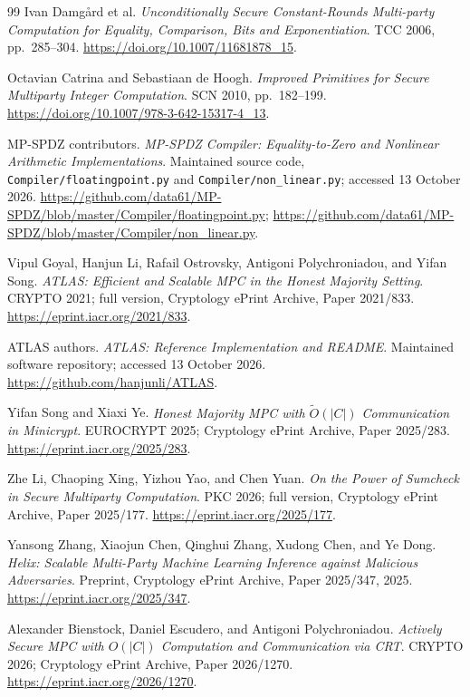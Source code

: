 \documentclass[11pt]{article}
\begin{document}
\begin{thebibliography}{99}
Ivan Damg\aa rd et al.
\emph{Unconditionally Secure Constant-Rounds Multi-party Computation for Equality, Comparison, Bits and Exponentiation}.
TCC 2006, pp.~285--304.
\url{https://doi.org/10.1007/11681878_15}.

Octavian Catrina and Sebastiaan de Hoogh.
\emph{Improved Primitives for Secure Multiparty Integer Computation}.
SCN 2010, pp.~182--199.
\url{https://doi.org/10.1007/978-3-642-15317-4_13}.

MP-SPDZ contributors.
\emph{MP-SPDZ Compiler: Equality-to-Zero and Nonlinear Arithmetic Implementations}.
Maintained source code, \texttt{Compiler/floatingpoint.py} and
\texttt{Compiler/non\_linear.py}; accessed 13 October 2026.
\url{https://github.com/data61/MP-SPDZ/blob/master/Compiler/floatingpoint.py};
\url{https://github.com/data61/MP-SPDZ/blob/master/Compiler/non_linear.py}.

Vipul Goyal, Hanjun Li, Rafail Ostrovsky, Antigoni Polychroniadou, and Yifan Song.
\emph{ATLAS: Efficient and Scalable MPC in the Honest Majority Setting}.
CRYPTO 2021; full version, Cryptology ePrint Archive, Paper 2021/833.
\url{https://eprint.iacr.org/2021/833}.

ATLAS authors.
\emph{ATLAS: Reference Implementation and README}.
Maintained software repository; accessed 13 October 2026.
\url{https://github.com/hanjunli/ATLAS}.

Yifan Song and Xiaxi Ye.
\emph{Honest Majority MPC with $\tilde{O}(|C|)$ Communication in Minicrypt}.
EUROCRYPT 2025; Cryptology ePrint Archive, Paper 2025/283.
\url{https://eprint.iacr.org/2025/283}.

Zhe Li, Chaoping Xing, Yizhou Yao, and Chen Yuan.
\emph{On the Power of Sumcheck in Secure Multiparty Computation}.
PKC 2026; full version, Cryptology ePrint Archive, Paper 2025/177.
\url{https://eprint.iacr.org/2025/177}.

Yansong Zhang, Xiaojun Chen, Qinghui Zhang, Xudong Chen, and Ye Dong.
\emph{Helix: Scalable Multi-Party Machine Learning Inference against Malicious Adversaries}.
Preprint, Cryptology ePrint Archive, Paper 2025/347, 2025.
\url{https://eprint.iacr.org/2025/347}.

Alexander Bienstock, Daniel Escudero, and Antigoni Polychroniadou.
\emph{Actively Secure MPC with $O(|C|)$ Computation and Communication via CRT}.
CRYPTO 2026; Cryptology ePrint Archive, Paper 2026/1270.
\url{https://eprint.iacr.org/2026/1270}.


\end{thebibliography}
\end{document}
